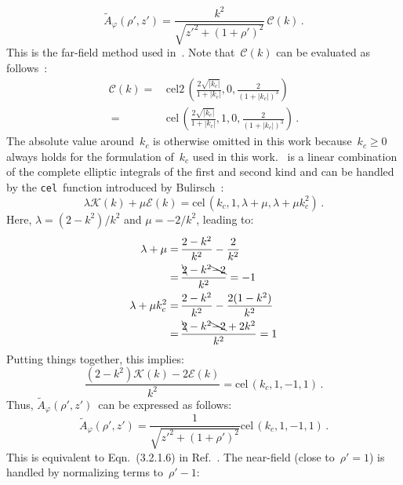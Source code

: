 \begin{equation}
  \tilde{A}_\varphi(\rho', z')
  = \frac{k^2}{\sqrt{z'^2 + (1 + \rho')^2}} \,\mathcal{C}(k) \label{eqn:cwl_A_phi_f_derivation} \, .
\end{equation}
This is the far-field method used in~.
Note that~$\mathcal{C}(k)$ can be evaluated as follows~\cite{bulirsch_1, bulirsch_3}:
\begin{align}
  \mathcal{C}(k) =&\, \textrm{cel2}\,\left(\frac{2 \sqrt{|k_c|}}{1+|k_c|},0,\frac{2}{(1+|k_c|)^3}\right) \nonumber \\
       ~         =&\, \textrm{cel}\,\left(\frac{2 \sqrt{|k_c|}}{1+|k_c|},1,0,\frac{2}{(1+|k_c|)^3}\right) \, .
\end{align}
The absolute value around~$k_c$ is otherwise omitted in this work
because~$k_c \geq 0$ always holds for the formulation of~$k_c$ used in this work.
~is a linear combination of the complete elliptic integrals
of the first and second kind and can be handled by the \texttt{cel}~function
introduced by Bulirsch~\cite{bulirsch_3}:
\begin{equation}
  \lambda \mathcal{K} (k) + \mu \mathcal{E} (k) = \textrm{cel}\,(k_c, 1, \lambda + \mu, \lambda + \mu k_c^2) \, .
\end{equation}
Here, $\lambda = (2 - k^2)/k^2$ and $\mu = -2/k^2$,
leading to:
\begin{align}
  \lambda + \mu       =&\, \frac{2 - k^2}{k^2} - \frac{2}{k^2} \nonumber \\
      ~               =&\, \frac{\bcancel{2} - k^2 \bcancel{-2}}{k^2} = -1 \nonumber \\
  \lambda + \mu k_c^2 =&\, \frac{2 - k^2}{k^2} - \frac{2 (1 - k^2)}{k^2} \nonumber \\
      ~               =&\, \frac{\bcancel{2} - k^2 \bcancel{-2} + 2 k^2}{k^2} = 1
\end{align}
Putting things together, this implies:
\begin{equation}
 \frac{(2 - k^2)\mathcal{K}(k) - 2 \mathcal{E}(k)}{k^2} = \textrm{cel}\,(k_c, 1, -1, 1) \, . \label{eqn:cel_kc_1}
\end{equation}
Thus, $\tilde{A}_\varphi(\rho',z')$~can be expressed as follows:
\begin{equation}
 \tilde{A}_\varphi(\rho',z')
 = \frac{1}{\sqrt{z'^2 + (1 + \rho')^2}}
   \textrm{cel}\,(k_c, 1, -1, 1) \, . \label{eqn:cwl_A_phi_using_cel}
\end{equation}
This is equivalent to Eqn.~(3.2.1.6) in Ref.~\cite{teal}.
The near-field (close to~$\rho' = 1$) is handled by normalizing terms to~$\rho'-1$:
